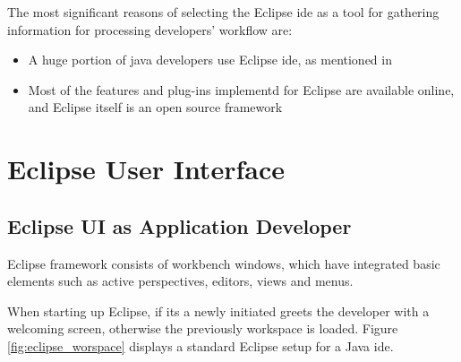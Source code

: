The most significant reasons of selecting the Eclipse \gls{ide} as a tool for gathering information for processing developers' workflow are: 
\begin{itemize}
\item A huge portion of java developers use Eclipse \gls{ide}, as mentioned in 
\item Most of the features and plug-ins implementd for Eclipse are available online, and Eclipse itself is an open source framework
\end{itemize}  

\section{Eclipse User Interface}
\label{sec:TheEclipseIDE:ui}
\subsection{Eclipse UI as Application Developer}
Eclipse framework consists of workbench windows, which have integrated basic elements such as active perspectives, editors, views and menus.

When starting up Eclipse, if its a newly initiated greets the developer with a welcoming screen, otherwise the previously workspace is loaded. Figure \ref{fig:eclipse_worspace} displays a standard Eclipse setup for a Java \gls{ide}. 

